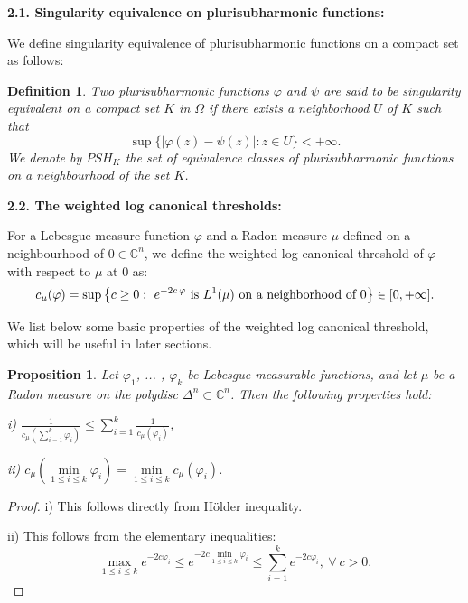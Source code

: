 \documentclass[a4paper,oneside,reqno,11pt]{article}
\newtheorem{proposition}[theorem]{Proposition}
\newtheorem{e-definition}[theorem]{Definition}
\def\n{\noindent}
\def\n{\noindent}
\begin{document}
{\bf 2.1. Singularity equivalence on plurisubharmonic functions:}

We define singularity equivalence of plurisubharmonic functions on a compact set as follows:

\begin{e-definition}\label{singularity_equivalent} Two plurisubharmonic functions $\varphi$ and $\psi$  are said to be singularity equivalent on a compact set $K$ in $\Omega$ if there exists a neighborhood $U$ of $K$ such that 
$$\sup \{ | \varphi  ( z ) - \psi ( z ) | : z\in U \}< +\infty.$$
We denote by $PSH_{K}$ the set of equivalence classes of plurisubharmonic functions on a neighbourhood of the set $K$.
\end{e-definition}

{\bf 2.2. The weighted log canonical thresholds:}

For a Lebesgue measure function $\varphi$ and a Radon measure $\mu$ defined on a neighbourhood of $0\in\mathbb C^n$, we define the weighted log canonical threshold of $\varphi$ with respect to $\mu$ at $0$ as:
$$c_{\mu}( \varphi ) = \sup\big\{ c \geq 0:\ e^{-2c\,\varphi} \hbox{ is } L^1(\mu ) \hbox{ on a neighborhood of }0\big\}\in [0,+\infty].$$

We list below some basic properties of the weighted log canonical threshold, which will be useful in later sections.

\begin{proposition}\label{weighted_lct}
Let $\varphi_1$, ... , $\varphi_k$ be Lebesgue measurable functions, and let $\mu$ be a Radon measure on the polydisc $\Delta^n\subset\mathbb C^n$. Then the following properties hold:

\n
i) $\frac { 1 } { c_{ \mu } ( \sum\limits_{ i = 1 }^k \varphi_i ) } \leq \sum\limits_{ i = 1 }^k \frac { 1 } { c_{\mu} ( \varphi_i ) }$,

\n
ii) $c_{ \mu } ( \min\limits_{ 1\leq i\leq k }  \varphi_i ) = \min\limits_{ 1\leq i\leq k }  c_{ \mu } ( \varphi_i )$.
\end{proposition}

\begin{proof} 
i) This follows directly from H\"{o}lder inequality.

\n
ii) This follows from the elementary inequalities:
$$\max\limits_{ 1\leq i\leq k } e^{ -2c \varphi_i }\leq e^{ -2c \min\limits_{ 1\leq i\leq k } \varphi_i }\leq\sum\limits_{ i = 1 }^k e^{ -2c \varphi_i },\ \forall\ c > 0.$$
\end{proof}
\end{document}
